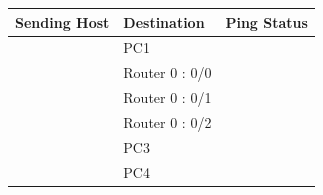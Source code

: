 \documentclass[a4paper,11pt]{article}
\begin{document}
\begin{enumerate}
\begin{itemize}
\begin{table}[H]
                        \begin{tabular}{| m{10em}| m{10em}| m{10em} |}
                            \hline
                            \multicolumn{1}{|l|}{\textbf{Sending Host}}                     & \textbf{Destination} & \multicolumn{1}{l|}{\textbf{Ping Status}}                                  \\
                            \hline
                            {\cellcolor[rgb]{0.141,0.525,1}}                                & PC1                  & {\cellcolor[rgb]{0.42,0.988,0.827}}                                        \\
                            \hhline{|>{\arrayrulecolor[rgb]{0.141,0.525,1}}->{\arrayrulecolor{black}}->{\arrayrulecolor[rgb]{0.42,0.988,0.827}}->{\arrayrulecolor{black}}|}
                            {\cellcolor[rgb]{0.141,0.525,1}}                                & Router 0 : 0/0       & {\cellcolor[rgb]{0.42,0.988,0.827}}                                        \\
                            \hhline{|>{\arrayrulecolor[rgb]{0.141,0.525,1}}->{\arrayrulecolor{black}}->{\arrayrulecolor[rgb]{0.42,0.988,0.827}}->{\arrayrulecolor{black}}|}
                            {\cellcolor[rgb]{0.141,0.525,1}}                                & Router 0 : 0/1       & {\cellcolor[rgb]{0.42,0.988,0.827}}                                        \\
                            \hhline{|>{\arrayrulecolor[rgb]{0.141,0.525,1}}->{\arrayrulecolor{black}}->{\arrayrulecolor[rgb]{0.42,0.988,0.827}}->{\arrayrulecolor{black}}|}
                            {\cellcolor[rgb]{0.141,0.525,1}}                                & Router 0 : 0/2       & {\cellcolor[rgb]{0.42,0.988,0.827}}                                        \\
                            \hhline{|>{\arrayrulecolor[rgb]{0.141,0.525,1}}->{\arrayrulecolor{black}}->{\arrayrulecolor[rgb]{0.42,0.988,0.827}}->{\arrayrulecolor{black}}|}
                            {\cellcolor[rgb]{0.141,0.525,1}}                                & PC3                  & {\cellcolor[rgb]{0.42,0.988,0.827}}                                        \\
                            \hhline{|>{\arrayrulecolor[rgb]{0.141,0.525,1}}->{\arrayrulecolor{black}}->{\arrayrulecolor[rgb]{0.42,0.988,0.827}}->{\arrayrulecolor{black}}|}
                            {\cellcolor[rgb]{0.141,0.525,1}}                                & PC4                  & {\cellcolor[rgb]{0.42,0.988,0.827}}                                        \\

\end{tabular}
\end{table}
\end{itemize}
\end{enumerate}
\end{document}
